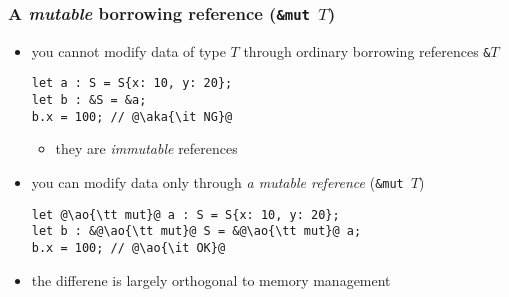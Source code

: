 \documentclass[12pt,dvipdfmx]{beamer}
\newcommand{\ao}[1]{{\color{blue}#1}}
\newcommand{\aka}[1]{{\color{red}#1}}
\begin{document}
\begin{frame}[fragile]
  \frametitle{A {\it mutable} borrowing reference ({\tt \&mut $T$})}
  \begin{itemize}
  \item you cannot modify data of type $T$
    through ordinary borrowing references {\tt \&$T$}
\begin{lstlisting}
let a : S = S{x: 10, y: 20};
let b : &S = &a;
b.x = 100; // @\aka{\it NG}@
\end{lstlisting}
    \begin{itemize}
    \item they are \ao{\it immutable} references
    \end{itemize}
  \item you can modify data only through
    {\it a mutable reference} ({\tt \&mut $T$})
\begin{lstlisting}
let @\ao{\tt mut}@ a : S = S{x: 10, y: 20};
let b : &@\ao{\tt mut}@ S = &@\ao{\tt mut}@ a;
b.x = 100; // @\ao{\it OK}@
\end{lstlisting}
\item the differene is largely orthogonal to memory management
  \end{itemize}
\end{frame}

\iffalse
\begin{frame}[fragile]
  \frametitle{Additional restrictions on {\tt \&mut $T$}}
  \begin{itemize}
  \item a stronger restriction is imposed on {\tt \&mut $T$}
    \begin{itemize}
    \item you cannot use the originating (owning) pointer
      ($T$ or {\tt Box<$T$>}) or
    \item derive other borrowing pointers (mutable or not)
      from a mutable borrowing
      reference ({\tt \&mut $T$})
    \end{itemize}
    where a mutable borrowing reference is {\it active} in scope
  \item {\it active} $\approx$ may be used in future (omitting details)
\begin{lstlisting}
fn mut_ref() {      
  let mut a = S{x: ...};
  let @\ao{\tt m}@ = &mut a; // make a mutable ref to a
  ... a.x ...;    // @\aka{\it NG: cannot use a (the originating pointer)}@
  let d = &a;     // @\aka{\it NG: cannot borrow from a either}@
  let c = m;      // @\aka{\it NG: cannot derive another reference}@
  @\ao{\tt m.x}@             // --- m is active up to this point
  ... a.x ...;    // @\ao{\it OK: as m no longer active here}@
}
\end{lstlisting}
\end{itemize}
\end{frame}
\fi
\end{document}
